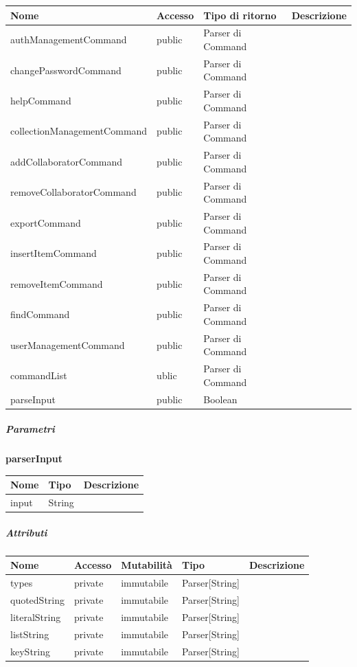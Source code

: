 \documentclass{scalatekids-article}
\begin{document}
\begin{tabular}{| l | l | l | l |} %
	\hline
	Nome & Accesso & Tipo di ritorno & Descrizione\\
	\hline
	authManagementCommand & public & Parser di Command & \\
	\hline
	changePasswordCommand & public & Parser di Command & \\
	\hline
	helpCommand & public & Parser di Command & \\
	\hline
	collectionManagementCommand & public & Parser di Command & \\
	\hline
	addCollaboratorCommand & public & Parser di Command & \\
	\hline
	removeCollaboratorCommand & public & Parser di Command & \\
	\hline
	exportCommand & public & Parser di Command & \\
	\hline
	insertItemCommand & public & Parser di Command & \\
	\hline
	removeItemCommand & public & Parser di Command & \\
	\hline
	findCommand & public & Parser di Command & \\
	\hline
	userManagementCommand & public & Parser di Command & \\
	\hline
	commandList & ublic & Parser di Command & \\
	\hline
	parseInput & public & Boolean & \\
	\hline
\end{tabular}

\subparagraph{Parametri}

\begin{center}
	\textbf{parserInput}
\end{center}
\begin{tabular}{| l | l | l |}
	\hline
	Nome & Tipo & Descrizione\\
	\hline
	input & String & \\
	\hline
\end{tabular}

\subparagraph{Attributi}

\begin{tabular}{| l | l | l | l | l |}
	\hline
	Nome & Accesso & Mutabilità & Tipo & Descrizione\\
	\hline
	types & private & immutabile & Parser[String] & \\
	\hline
	quotedString & private & immutabile & Parser[String] & \\
	\hline
	literalString & private & immutabile & Parser[String] & \\
	\hline
	listString & private & immutabile & Parser[String] & \\
	\hline
	keyString & private & immutabile & Parser[String] & \\
	\hline
\end{tabular}
\end{document}
